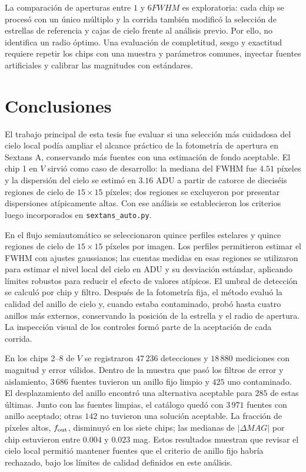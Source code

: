 \documentclass[12pt,letterpaper,oneside]{book}
\begin{document}
La comparación de aperturas entre $1$ y $6FWHM$ es exploratoria: cada chip se procesó con un único múltiplo y la corrida también modificó la selección de estrellas de referencia y cajas de cielo frente al análisis previo. Por ello, no identifica un radio óptimo. Una evaluación de completitud, sesgo y exactitud requiere repetir los chips con una muestra y parámetros comunes, inyectar fuentes artificiales y calibrar las magnitudes con estándares.



\chapter{Conclusiones}

El trabajo principal de esta tesis fue evaluar si una selección más cuidadosa del cielo local podía ampliar el alcance práctico de la fotometría de apertura en Sextans A, conservando más fuentes con una estimación de fondo aceptable. El chip 1 en $V$ sirvió como caso de desarrollo: la mediana del FWHM fue $4.51$ píxeles y la dispersión del cielo se estimó en $3.16$ ADU a partir de catorce de dieciséis regiones de cielo de $15\times15$ píxeles; dos regiones se excluyeron por presentar dispersiones atípicamente altas. Con ese análisis se establecieron los criterios luego incorporados en \texttt{sextans\_auto.py}.

En el flujo semiautomático se seleccionaron quince perfiles estelares y quince regiones de cielo de $15\times15$ píxeles por imagen. Los perfiles permitieron estimar el FWHM con ajustes gaussianos; las cuentas medidas en esas regiones se utilizaron para estimar el nivel local del cielo en ADU y su desviación estándar, aplicando límites robustos para reducir el efecto de valores atípicos. El umbral de detección se calculó por chip y filtro. Después de la fotometría fija, el método evaluó la calidad del anillo de cielo y, cuando estaba contaminado, probó hasta cuatro anillos más externos, conservando la posición de la estrella y el radio de apertura. La inspección visual de los controles formó parte de la aceptación de cada corrida.

En los chips 2--8 de $V$ se registraron $47\,236$ detecciones y $18\,880$ mediciones con magnitud y error válidos. Dentro de la muestra que pasó los filtros de error y aislamiento, $3\,686$ fuentes tuvieron un anillo fijo limpio y $425$ uno contaminado. El desplazamiento del anillo encontró una alternativa aceptable para $285$ de estas últimas. Junto con las fuentes limpias, el catálogo quedó con $3\,971$ fuentes con anillo aceptado; otras $142$ no tuvieron una solución aceptable. La fracción de píxeles altos, $f_{\rm out}$, disminuyó en los siete chips; las medianas de $|\Delta MAG|$ por chip estuvieron entre $0.004$ y $0.023$ mag. Estos resultados muestran que revisar el cielo local permitió mantener fuentes que el criterio de anillo fijo habría rechazado, bajo los límites de calidad definidos en este análisis.
\end{document}
